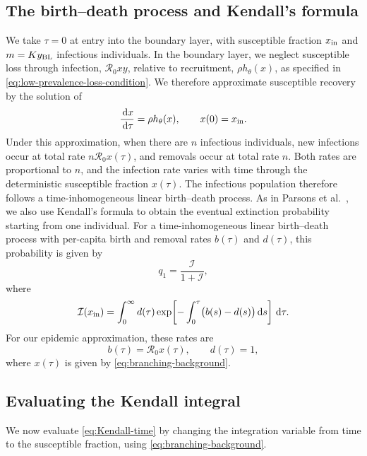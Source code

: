 \documentclass[11pt]{article}
\newcommand{\Rzero}{\mathcal R_0}
\newcommand{\rhoeps}{\rho}
\newcommand{\hth}{h_\theta}
\newcommand{\yin}{y_{\rm BL}}
\newcommand{\xin}{x_{\rm in}}
\newcommand{\dd}{\,\mathrm d}
\begin{document}
\subsection{The birth--death process and Kendall's formula}
We take \(\tau=0\) at entry into the boundary layer, with susceptible fraction \(\xin\) and \(m=K\yin\) infectious individuals. In the boundary layer, we neglect susceptible loss through infection, \(\Rzero xy\), relative to recruitment, \(\rhoeps\hth(x)\), as specified in \cref{eq:low-prevalence-loss-condition}. We therefore approximate susceptible recovery by the solution of
\begin{equation}
\frac{\dd x}{\dd\tau}=\rhoeps\hth(x),\qquad x(0)=\xin.
\label{eq:branching-background}
\end{equation}
Under this approximation, when there are \(n\) infectious individuals, new infections occur at total rate \(n\Rzero x(\tau)\), and removals occur at total rate \(n\). Both rates are proportional to \(n\), and the infection rate varies with time through the deterministic susceptible fraction \(x(\tau)\). The infectious population therefore follows a time-inhomogeneous linear birth--death process.
As in Parsons et al.\ \cite{ParsonsEtAl2024}, we also use Kendall's formula \cite{Kendall1948} to obtain the eventual extinction probability starting from one individual. For a time-inhomogeneous linear birth--death process with per-capita birth and removal rates \(b(\tau)\) and \(d(\tau)\), this probability is given by
\begin{equation}
q_1=\frac{\mathcal{I}}{1+\mathcal{I}},
\label{eq:q1}
\end{equation}
where
\begin{equation}
\mathcal{I}(\xin)=\int_0^\infty d(\tau)
\exp\!\left[-\int_0^\tau\bigl(b(s)-d(s)\bigr)\dd s\right]\dd\tau.
\label{eq:Kendall-time}
\end{equation}
For our epidemic approximation, these rates are
\begin{equation}
b(\tau)=\Rzero x(\tau),\qquad d(\tau)=1,
\label{eq:branching-rates}
\end{equation}
where \(x(\tau)\) is given by \cref{eq:branching-background}.

\subsection{Evaluating the Kendall integral}
We now evaluate \cref{eq:Kendall-time} by changing the integration variable from time to the susceptible fraction, using \cref{eq:branching-background}.
\end{document}
